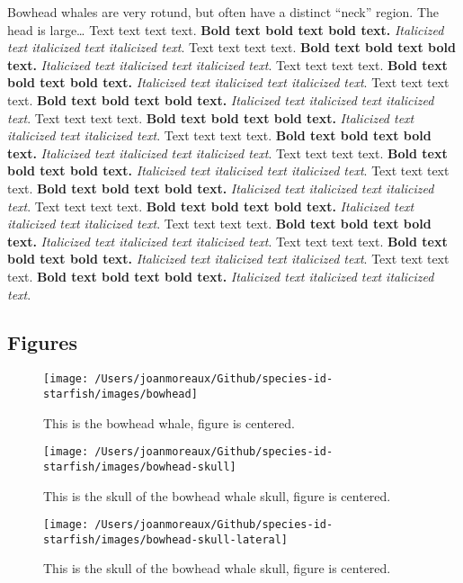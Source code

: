 \documentclass[]{article}
\begin{document}
Bowhead whales are very rotund, but often have a distinct ``neck''
region. The head is large\ldots{} Text text text text. \textbf{Bold text
bold text bold text.} \emph{Italicized text italicized text italicized
text}. Text text text text. \textbf{Bold text bold text bold text.}
\emph{Italicized text italicized text italicized text}. Text text text
text. \textbf{Bold text bold text bold text.} \emph{Italicized text
italicized text italicized text}. Text text text text. \textbf{Bold text
bold text bold text.} \emph{Italicized text italicized text italicized
text}. Text text text text. \textbf{Bold text bold text bold text.}
\emph{Italicized text italicized text italicized text}. Text text text
text. \textbf{Bold text bold text bold text.} \emph{Italicized text
italicized text italicized text}. Text text text text. \textbf{Bold text
bold text bold text.} \emph{Italicized text italicized text italicized
text}. Text text text text. \textbf{Bold text bold text bold text.}
\emph{Italicized text italicized text italicized text}. Text text text
text. \textbf{Bold text bold text bold text.} \emph{Italicized text
italicized text italicized text}. Text text text text. \textbf{Bold text
bold text bold text.} \emph{Italicized text italicized text italicized
text}. Text text text text. \textbf{Bold text bold text bold text.}
\emph{Italicized text italicized text italicized text}. Text text text
text. \textbf{Bold text bold text bold text.} \emph{Italicized text
italicized text italicized text}.

\newpage

\hypertarget{figures-1}{%
\subsection{Figures}\label{figures-1}}

\begin{figure}
\texttt{[image: /Users/joanmoreaux/Github/species-id-starfish/images/bowhead]} \caption{This is the bowhead whale, figure is centered.}\label{fig:bowhead-whale}
\end{figure}

\begin{figure}
\texttt{[image: /Users/joanmoreaux/Github/species-id-starfish/images/bowhead-skull]} \caption{This is the skull of the bowhead whale skull, figure is centered.}\label{fig:bowhead-whale-skull}
\end{figure}

\begin{figure}
\texttt{[image: /Users/joanmoreaux/Github/species-id-starfish/images/bowhead-skull-lateral]} \caption{This is the skull of the bowhead whale skull, figure is centered.}\label{fig:bowhead-whale-skull-lateral}
\end{figure}
\end{document}
